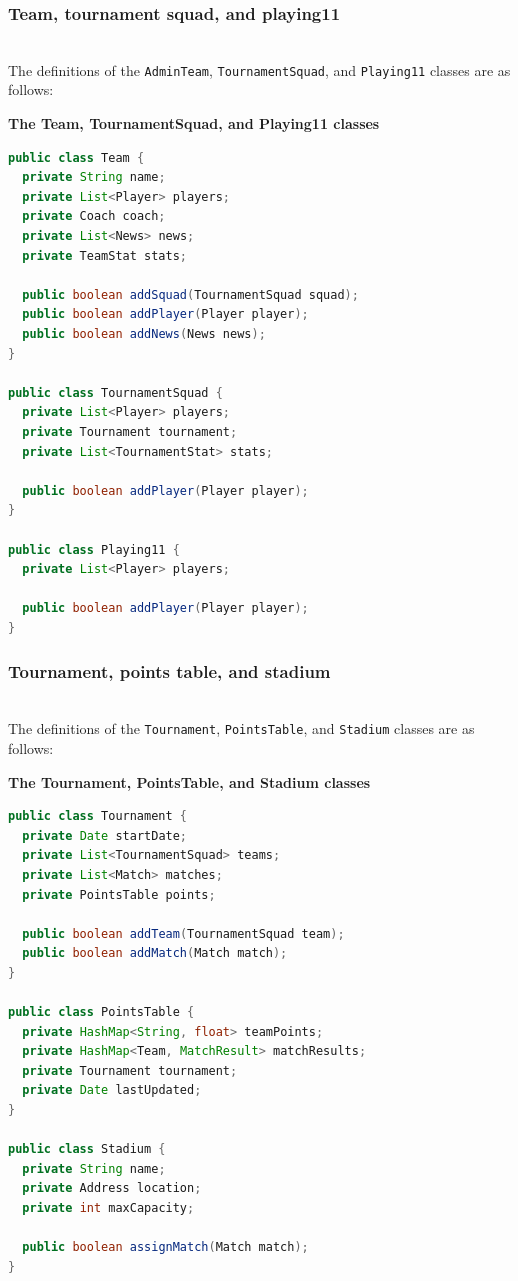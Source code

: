 \subsubsection{Team, tournament squad, and playing11}\label{ptW5d8lw6M7VpKBmFqwpZ}
\\
The definitions of the \texttt{AdminTeam}, \texttt{TournamentSquad}, and \texttt{Playing11} classes are as follows:

\textbf{The Team, TournamentSquad, and Playing11 classes}

\begin{lstlisting}[language=Java]
public class Team {
  private String name;
  private List<Player> players;
  private Coach coach;
  private List<News> news;
  private TeamStat stats;

  public boolean addSquad(TournamentSquad squad);
  public boolean addPlayer(Player player);
  public boolean addNews(News news);
}

public class TournamentSquad {
  private List<Player> players;
  private Tournament tournament;
  private List<TournamentStat> stats;

  public boolean addPlayer(Player player);
}

public class Playing11 {
  private List<Player> players;

  public boolean addPlayer(Player player);
}
\end{lstlisting}

\subsubsection{Tournament, points table, and stadium}\label{JOi82YXqSnT_Th0_exBV2}
\\
The definitions of the \texttt{Tournament}, \texttt{PointsTable}, and \texttt{Stadium} classes are as follows:

\textbf{The Tournament, PointsTable, and Stadium classes}

\begin{lstlisting}[language=Java]
public class Tournament {
  private Date startDate;
  private List<TournamentSquad> teams;
  private List<Match> matches;
  private PointsTable points;

  public boolean addTeam(TournamentSquad team);
  public boolean addMatch(Match match);
}

public class PointsTable {
  private HashMap<String, float> teamPoints;
  private HashMap<Team, MatchResult> matchResults;
  private Tournament tournament;
  private Date lastUpdated;
}

public class Stadium {
  private String name;
  private Address location;
  private int maxCapacity;
  
  public boolean assignMatch(Match match);
}
\end{lstlisting}

